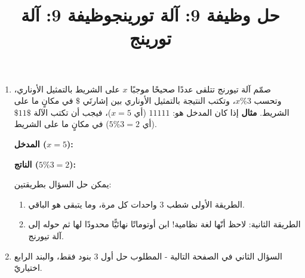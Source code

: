 \documentclass[14pt]{extarticle}
\title{حل وظيفة 9: آلة تورينج}
\title{وظيفة 9: آلة تورينج}
\begin{document}
\maketitle

\begin{enumerate}[itemsep=2em]
\item صمّم آلة تيورنج تتلقى عددًا صحيحًا موجبًا $x$ على الشريط بالتمثيل الأوناري، وتحسب $x \% 3$، وتكتب النتيجة بالتمثيل الأوناري بين إشارتَي $\$$ في مكانٍ ما على الشريط.
\textbf{مثال} إذا كان المدخل هو: $11111$ (أي $x=5$)، فيجب أن تكتب الآلة $\$11\$$ (أي $5 \% 3 = 2$) في مكانٍ ما على الشريط.

\textbf{المدخل ($x=5$):}

\vspace{0.5em}

\textbf{الناتج ($5 \% 3 = 2$):}
\hspace{0.5em}

\begin{boxNote}
    يمكن حل السؤال بطريقتين:
    \begin{enumerate}
        \item الطريقة الأولى شطب 3 واحدات كل مرة، وما يتبقى هو الباقي.
    \item الطريقة الثانية: لاحظ أنّها لغة نظامية! ابن أوتوماتًا نهائيًّا محدودًا لها ثم حوله إلى آلة تيورنج.
    \end{enumerate}
\end{boxNote}

\item السؤال الثاني في الصفحة التالية - المطلوب حل أول 3 بنود فقط، والبند الرابع اختياريّ.
\end{enumerate}


\end{document}
